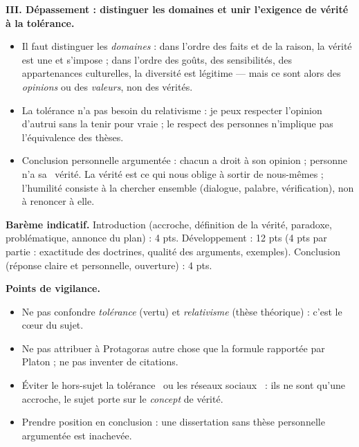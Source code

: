\documentclass[11pt]{article}
\begin{document}
\begin{corrige}
\textbf{III. Dépassement : distinguer les domaines et unir l'exigence de vérité à la tolérance.}
\begin{itemize}
\item Il faut distinguer les \emph{domaines} : dans l'ordre des faits et de la raison, la vérité est une et s'impose ; dans l'ordre des goûts, des sensibilités, des appartenances culturelles, la diversité est légitime — mais ce sont alors des \emph{opinions} ou des \emph{valeurs}, non des vérités.
\item La tolérance n'a pas besoin du relativisme : je peux respecter l'opinion d'autrui sans la tenir pour vraie ; le respect des personnes n'implique pas l'équivalence des thèses.
\item Conclusion personnelle argumentée : chacun a droit à son opinion ; personne n'a \guillemotleft sa \guillemotright\ vérité. La vérité est ce qui nous oblige à sortir de nous-mêmes ; l'humilité consiste à la chercher ensemble (dialogue, palabre, vérification), non à renoncer à elle.
\end{itemize}

\textbf{Barème indicatif.} Introduction (accroche, définition de la vérité, paradoxe, problématique, annonce du plan) : 4 pts. Développement : 12 pts (4 pts par partie : exactitude des doctrines, qualité des arguments, exemples). Conclusion (réponse claire et personnelle, ouverture) : 4 pts.

\textbf{Points de vigilance.}
\begin{itemize}
\item Ne pas confondre \emph{tolérance} (vertu) et \emph{relativisme} (thèse théorique) : c'est le cœur du sujet.
\item Ne pas attribuer à Protagoras autre chose que la formule rapportée par Platon ; ne pas inventer de citations.
\item Éviter le hors-sujet \guillemotleft la tolérance \guillemotright\ ou \guillemotleft les réseaux sociaux \guillemotright\ : ils ne sont qu'une accroche, le sujet porte sur le \emph{concept} de vérité.
\item Prendre position en conclusion : une dissertation sans thèse personnelle argumentée est inachevée.
\end{itemize}
\end{corrige}
\end{document}
